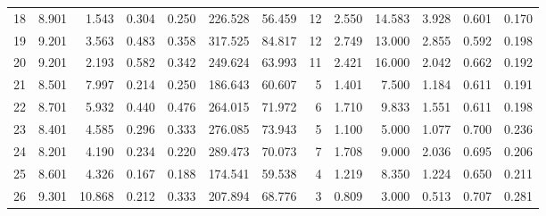 \begin{tabular}{rrrrrrrrrrrrr}
18 & 8.901 & 1.543 & 0.304 & 0.250 & 226.528 & 56.459 & 12 & 2.550 & 14.583 & 3.928 & 0.601 & 0.170 \\
19 & 9.201 & 3.563 & 0.483 & 0.358 & 317.525 & 84.817 & 12 & 2.749 & 13.000 & 2.855 & 0.592 & 0.198 \\
20 & 9.201 & 2.193 & 0.582 & 0.342 & 249.624 & 63.993 & 11 & 2.421 & 16.000 & 2.042 & 0.662 & 0.192 \\
21 & 8.501 & 7.997 & 0.214 & 0.250 & 186.643 & 60.607 & 5 & 1.401 & 7.500 & 1.184 & 0.611 & 0.191 \\
22 & 8.701 & 5.932 & 0.440 & 0.476 & 264.015 & 71.972 & 6 & 1.710 & 9.833 & 1.551 & 0.611 & 0.198 \\
23 & 8.401 & 4.585 & 0.296 & 0.333 & 276.085 & 73.943 & 5 & 1.100 & 5.000 & 1.077 & 0.700 & 0.236 \\
24 & 8.201 & 4.190 & 0.234 & 0.220 & 289.473 & 70.073 & 7 & 1.708 & 9.000 & 2.036 & 0.695 & 0.206 \\
25 & 8.601 & 4.326 & 0.167 & 0.188 & 174.541 & 59.538 & 4 & 1.219 & 8.350 & 1.224 & 0.650 & 0.211 \\
26 & 9.301 & 10.868 & 0.212 & 0.333 & 207.894 & 68.776 & 3 & 0.809 & 3.000 & 0.513 & 0.707 & 0.281 \\
\end{tabular}
